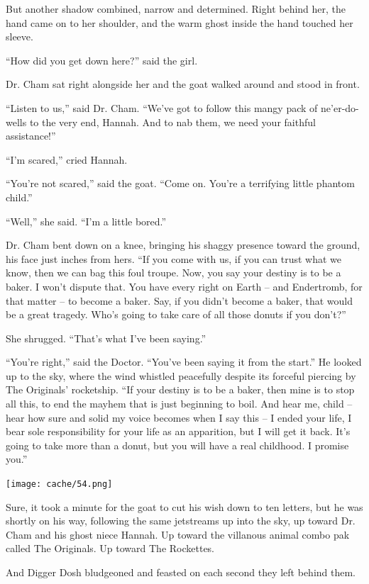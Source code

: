 \documentclass[12pt,twoside]{report}
\begin{document}
But another shadow combined, narrow and determined.  Right behind her,
the hand came on to her shoulder, and the warm ghost inside the hand
touched her sleeve.

``How did you get down here?'' said the girl.

Dr. Cham sat right alongside her and the goat walked around and stood
in front.

``Listen to us,'' said Dr. Cham.  ``We've got to follow this mangy
pack of ne'er-do-wells to the very end, Hannah.  And to nab them, we
need your faithful assistance!''

``I'm scared,'' cried Hannah.

``You're not scared,'' said the goat.  ``Come on.  You're a terrifying
little phantom child.''

``Well,'' she said.  ``I'm a little bored.''

Dr. Cham bent down on a knee, bringing his shaggy presence toward the
ground, his face just inches from hers.  ``If you come with us, if you
can trust what we know, then we can bag this foul troupe.  Now, you
say your destiny is to be a baker.  I won't dispute that. You have
every right on Earth -- and Endertromb, for that matter -- to become a
baker. Say, if you didn't become a baker, that would be a great
tragedy.  Who's going to take care of all those donuts if you don't?''

She shrugged.  ``That's what I've been saying.''

``You're right,'' said the Doctor.  ``You've been saying it from the
start.''  He looked up to the sky, where the wind whistled peacefully
despite its forceful piercing by The Originals' rocketship.  ``If your
destiny is to be a baker, then mine is to stop all this, to end the
mayhem that is just beginning to boil.  And hear me, child -- hear how
sure and solid my voice becomes when I say this -- I ended your life,
I bear sole responsibility for your life as an apparition, but I will
get it back.  It's going to take more than a donut, but you will have
a real childhood.  I promise you.''

	\texttt{[image: cache/54.png]}

Sure, it took a minute for the goat to cut his wish down to ten
letters, but he was shortly on his way, following the same jetstreams
up into the sky, up toward Dr. Cham and his ghost niece Hannah.  Up
toward the villanous animal combo pak called The Originals.  Up toward
The Rockettes.

And Digger Dosh bludgeoned and feasted on each second they left behind
them.
\end{document}
